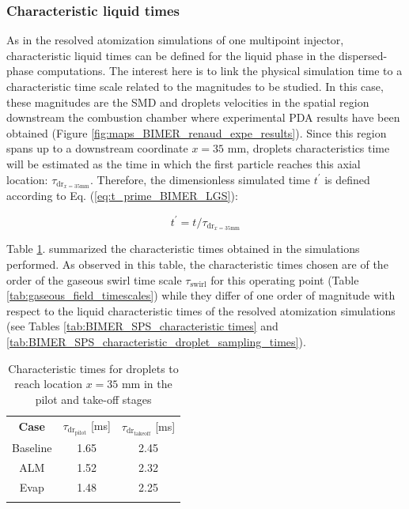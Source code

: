 \subsubsection*{Characteristic liquid times}

As in the resolved atomization simulations of one multipoint injector, characteristic liquid times can be defined for the liquid phase in the dispersed-phase computations. The interest here is to link the physical simulation time to a characteristic time scale related to the magnitudes to be studied. In this case, these magnitudes are the SMD and droplets velocities in the spatial region downstream the combustion chamber where experimental PDA results have been obtained (Figure \ref{fig:maps_BIMER_renaud_expe_results}). Since this region spans up to a downstream coordinate $x = 35$ mm, droplets characteristics time will be estimated as the time in which the first particle reaches this axial location: $\tau_{\mathrm{dr}_{x=35\mathrm{mm}}}$. Therefore, the dimensionless simulated time $t^{\prime}$ is defined according to Eq. (\ref{eq:t_prime_BIMER_LGS}):

\begin{equation}
\label{eq:t_prime_BIMER_LGS}
t^{\prime} = t / \tau_{\mathrm{dr}_{x=35\mathrm{mm}}}
\end{equation}


Table \ref{tab:BIMER_dispersed_phase_characteristic_times}.  summarized the characteristic times obtained in the simulations performed. As observed in this table, the characteristic times chosen are of the order of the gaseous swirl time scale $\tau_\mathrm{swirl}$ for this operating point (Table \ref{tab:gaseous_field_timescales}) while they differ of one order of magnitude with respect to the liquid characteristic times of the resolved atomization simulations (see Tables \ref{tab:BIMER_SPS_characteristic times} and \ref{tab:BIMER_SPS_characteristic_droplet_sampling_times}).  %


\begin{table}[!h]
\centering
\caption{Characteristic times for droplets to reach location $x = 35$ mm in the pilot and take-off stages }
\begin{tabular}{ccc}
\thickhline
\textbf{Case} & $\tau_{\mathrm{dr}_\mathrm{pilot}}$ [ms] & $\tau_{\mathrm{dr}_\mathrm{takeoff}}$ [ms] \\
\thickhline
Baseline & 1.65 & 2.45 \\  %
ALM & 1.52 & 2.32 \\ %
Evap & 1.48 & 2.25 \\ %
\thickhline
\end{tabular}
\label{tab:BIMER_dispersed_phase_characteristic_times}
\end{table}





